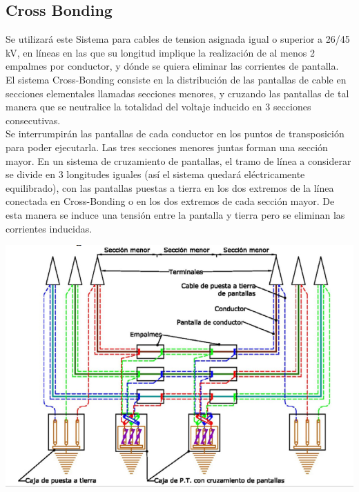 \documentclass[10pt,a4paper]{article}
\begin{document}
\newpage
\subsection{Cross Bonding}
Se utilizará este Sistema para cables de tension asignada igual o superior a 26/45 kV, en líneas en las que su longitud implique la realización de al menos 2 empalmes por conductor, y dónde se quiera eliminar las corrientes de pantalla.
\\
El sistema Cross-Bonding consiste en la distribución de las pantallas de cable en secciones elementales llamadas secciones menores, y cruzando las pantallas de tal manera que se neutralice la totalidad del voltaje inducido en 3 secciones consecutivas.
\\
Se interrumpirán las pantallas de cada conductor en los puntos de transposición para poder ejecutarla. Las tres secciones menores juntas forman una sección mayor. En un sistema de cruzamiento de pantallas, el tramo de línea a considerar se divide en 3 longitudes iguales (así el sistema quedará eléctricamente equilibrado), con las pantallas puestas a tierra en los dos extremos de la línea conectada en Cross-Bonding o en los dos extremos de cada sección mayor. De esta manera se induce una tensión entre la pantalla y tierra pero se eliminan las corrientes inducidas.
\begin{center}
        \includegraphics[scale = 0.6]{Cross.png}
    \end{center}
\end{document}
